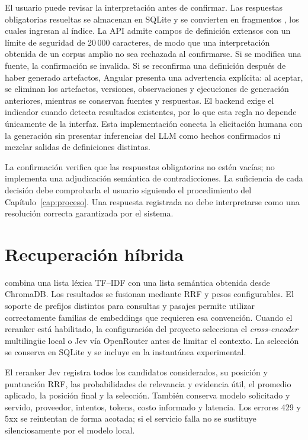 El usuario puede revisar la interpretación antes de confirmar. Las respuestas obligatorias resueltas se almacenan en SQLite y se convierten en fragmentos , los cuales ingresan al índice. La API admite campos de definición extensos con un límite de seguridad de 20\,000 caracteres, de modo que una interpretación obtenida de un corpus amplio no sea rechazada al confirmarse. Si se modifica una fuente, la confirmación se invalida. Si se reconfirma una definición después de haber generado artefactos, Angular presenta una advertencia explícita: al aceptar, se eliminan los artefactos, versiones, observaciones y ejecuciones de generación anteriores, mientras se conservan fuentes y respuestas. El backend exige el indicador  cuando detecta resultados existentes, por lo que esta regla no depende únicamente de la interfaz. Esta implementación conecta la elicitación humana con la generación sin presentar inferencias del LLM como hechos confirmados ni mezclar salidas de definiciones distintas.

La confirmación verifica que las respuestas obligatorias no estén vacías; no implementa una adjudicación semántica de contradicciones. La suficiencia de cada decisión debe comprobarla el usuario siguiendo el procedimiento del Capítulo~\ref{cap:proceso}. Una respuesta registrada no debe interpretarse como una resolución correcta garantizada por el sistema.

\section{Recuperación híbrida}

 combina una lista léxica TF--IDF con una lista semántica obtenida desde ChromaDB. Los resultados se fusionan mediante RRF y pesos configurables. El soporte de prefijos distintos para consultas y pasajes permite utilizar correctamente familias de embeddings que requieren esa convención. Cuando el reranker está habilitado, la configuración del proyecto selecciona el \emph{cross-encoder} multilingüe local o Jev vía OpenRouter antes de limitar el contexto. La selección se conserva en SQLite y se incluye en la instantánea experimental.

El reranker Jev registra todos los candidatos considerados, su posición y puntuación RRF, las probabilidades de relevancia y evidencia útil, el promedio aplicado, la posición final y la selección. También conserva modelo solicitado y servido, proveedor, intentos, tokens, costo informado y latencia. Los errores 429 y 5xx se reintentan de forma acotada; si el servicio falla no se sustituye silenciosamente por el modelo local.


